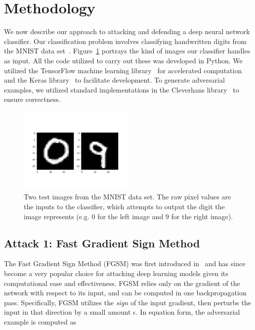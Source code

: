 \documentclass{article}
\begin{document}
\section{Methodology}

We now describe our approach to attacking and defending a deep neural network
classifier. Our classification problem involves classifying handwritten digits
from the MNIST data set~\cite{lecun1998mnist}. Figure~\ref{fig:mnist-example}
portrays the kind of images our classifier handles as input. All the code
utilized to carry out these was developed in Python. We utilized the TensorFlow
machine learning library~\cite{abadi2016tensorflow} for accelerated computation
and the Keras library~\cite{chollet2015keras} to facilitate development. To
generate adversarial examples, we utilized standard implementations in the
Cleverhans library~\cite{goodfellow2016cleverhans} to ensure correctness.

\begin{figure}
  \includegraphics[width=0.5\textwidth]{normal}
  \caption{Two test images from the MNIST data set. The raw pixel values are the
  inputs to the classifier, which attempts to output the digit the image
represents (e.g\@. 0 for the left image and 9 for the right image).}%
  \label{fig:mnist-example}
\end{figure}

\subsection{Attack 1: Fast Gradient Sign Method}

The Fast Gradient Sign Method (FGSM) was first introduced
in~\cite{goodfellow2014explaining} and has since become a very popular choice
for attacking deep learning models given its computational ease and
effectiveness. FGSM relies only on the gradient of the network with respect to
its input, and can be computed in one backpropagation pass. Specifically, FGSM
utilizes the \textit{sign} of the input gradient, then perturbs the input in
that direction by a small amount $\epsilon$. In equation form, the adversarial
example is computed as
\end{document}
